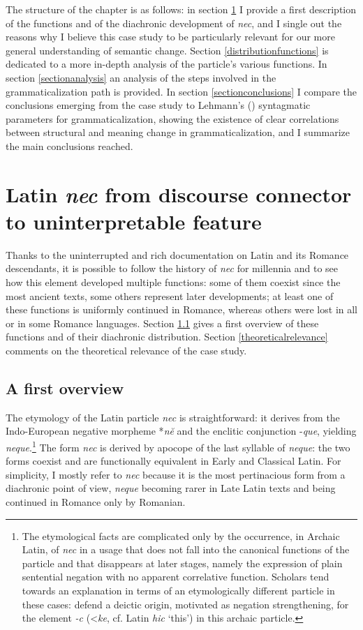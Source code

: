 \documentclass[output=paper,modfonts,nonflat,citecolor=brown,
showindex
]{langsci/langscibook}
\begin{document}
The structure of the chapter is as follows: in section \ref{generalintro} I provide a first description of the functions and of the diachronic development of {\em{nec}}, and I single out the reasons why I believe this case study to be particularly relevant for our more general understanding of semantic change. Section \ref{distributionfunctions} is dedicated to a more in-depth analysis of the particle's various functions. In section \ref{sectionanalysis} an analysis of the steps involved in the grammaticalization path is provided. In section \ref{sectionconclusions} I compare the  conclusions emerging from the case study to Lehmann's (\citeyear{Lehmann15}) syntagmatic parameters for grammaticalization, showing the existence of clear correlations between structural and meaning change in grammaticalization, and I summarize the main conclusions reached. 

\section{Latin {\em{nec}} from discourse connector to uninterpretable feature} \label{generalintro}

Thanks to the uninterrupted and rich documentation on Latin and its Romance descendants, it is possible to follow the history of {\em{nec}} for millennia and to see how this element developed multiple functions: some of them coexist since the most ancient texts, some others represent later developments; at least one of these functions is uniformly continued in Romance, whereas others were lost in all or in some Romance languages. Section \ref{corefacts} gives a first overview of these functions and of their diachronic distribution. Section \ref{theoreticalrelevance} comments on the theoretical relevance of the case study.
 

\subsection{A first overview} \label{corefacts}

The etymology of the Latin particle {\em{nec}} is straightforward: it derives from the Indo-European negative morpheme *{\em{n\u{e}}} and the enclitic conjunction -{\em{que}}, yielding {\em{neque}}.{\footnote{The etymological facts are complicated only by the occurrence, in Archaic Latin, of {\em{nec}} in a usage that does not fall into the canonical functions of the particle and that disappears at later stages, namely the expression of plain sentential negation with no apparent correlative function. Scholars tend towards an explanation in terms of an etymologically different particle in these cases: \citet[29-30]{OrlandiniPoccetti07} defend a deictic origin, motivated as negation strengthening, for the element {\em{-c}} (\textless *{\em{ke}}, cf. Latin {\em{hic}} `this') in this archaic particle.}} The form {\em{nec}} is derived by apocope of the last syllable of {\em{neque}}: the two forms coexist and are functionally equivalent in Early and Classical Latin. For simplicity, I mostly refer to {\em{nec}} because it is the most pertinacious form from a diachronic point of view, {\em{neque}} becoming rarer in Late Latin texts and being continued in Romance only by Romanian.
\end{document}
